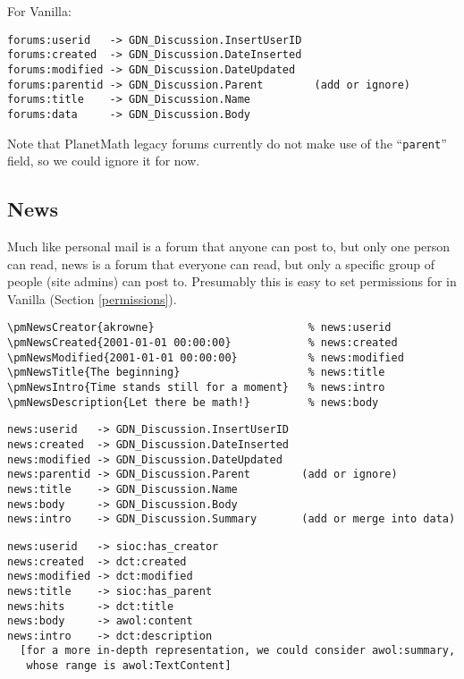 \documentclass{article}
\begin{document}
For Vanilla:

\begin{verbatim}
forums:userid   -> GDN_Discussion.InsertUserID
forums:created  -> GDN_Discussion.DateInserted
forums:modified -> GDN_Discussion.DateUpdated
forums:parentid -> GDN_Discussion.Parent        (add or ignore)
forums:title    -> GDN_Discussion.Name
forums:data     -> GDN_Discussion.Body
\end{verbatim}

Note that PlanetMath legacy forums currently do not make
use of the ``\verb|parent|'' field, so we could ignore it
for now.

\subsection{News}

Much like personal mail is a forum that anyone can post
to, but only one person can read, news is a forum that
everyone can read, but only a specific group of people
(site admins) can post to.  Presumably this is easy to set
permissions for in Vanilla (Section \ref{permissions}).

\begin{verbatim}
\pmNewsCreator{akrowne}                        % news:userid
\pmNewsCreated{2001-01-01 00:00:00}            % news:created
\pmNewsModified{2001-01-01 00:00:00}           % news:modified
\pmNewsTitle{The beginning}                    % news:title
\pmNewsIntro{Time stands still for a moment}   % news:intro
\pmNewsDescription{Let there be math!}         % news:body
\end{verbatim}

\begin{verbatim}
news:userid   -> GDN_Discussion.InsertUserID
news:created  -> GDN_Discussion.DateInserted
news:modified -> GDN_Discussion.DateUpdated
news:parentid -> GDN_Discussion.Parent        (add or ignore)
news:title    -> GDN_Discussion.Name
news:body     -> GDN_Discussion.Body
news:intro    -> GDN_Discussion.Summary       (add or merge into data)
\end{verbatim}

\begin{verbatim}
news:userid   -> sioc:has_creator
news:created  -> dct:created
news:modified -> dct:modified
news:title    -> sioc:has_parent
news:hits     -> dct:title
news:body     -> awol:content
news:intro    -> dct:description
  [for a more in-depth representation, we could consider awol:summary,
   whose range is awol:TextContent]
\end{verbatim}
\end{document}
